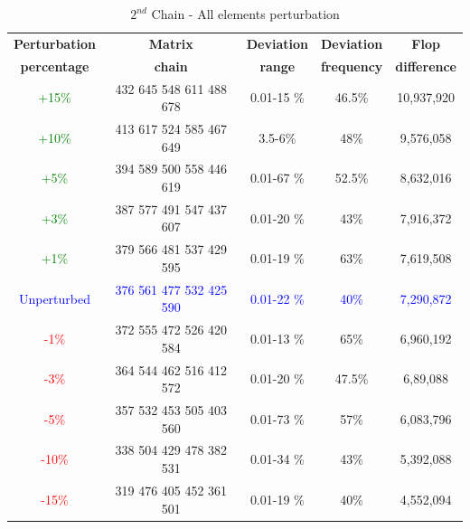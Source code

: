 \documentclass[10pts]{article}
\begin{document}
         \begin{table}[htp!]
         	\centering
         	
         	
         	\begin{tabular}{|c| c | c |c | c |}
         		\hline
         		\textbf{Perturbation} &\textbf{Matrix} & \textbf{Deviation} & \textbf{Deviation} & \textbf{Flop }\\
         		\textbf{percentage}&\textbf{chain}& \textbf{range}&\textbf{frequency}&\textbf{difference}\\
         		\hline
         		\textcolor{green}{+15\%}	&432 645 548 611 488 678	&	0.01-15 \%		&	46.5\%	&		10,937,920\\
         		\textcolor{green}{+10\%}	&413 617 524 585 467 649	&	3.5-6\%			&    48\%	&		9,576,058\\
         		\textcolor{green}{+5\%}	&394 589 500 558 446 619 &	0.01-67 \%		&	52.5\%	&		8,632,016\\
         		\textcolor{green}{+3\%}	&387 577 491 547 437 607	&	0.01-20 \%		&	43\%	&		7,916,372\\
         		\textcolor{green}{+1\%}	&379 566 481 537 429 595 &	0.01-19 \%		&	63\%	&		7,619,508\\
         		\textcolor{blue}{Unperturbed}	&\textcolor{blue}{376} \textcolor{blue}{561} \textcolor{blue}{477} \textcolor{blue}{532} \textcolor{blue}{425} \textcolor{blue}{590}	&    \textcolor{blue}{0.01-22 \%}		&	\textcolor{blue}{40\%}		&	\textcolor{blue}{7,290,872}\\
         		\textcolor{red}{-1\%}	&372 555 472 526 420 584	&	0.01-13 \%		&	65\%	&		6,960,192\\	
         		\textcolor{red}{-3\%}	&364 544 462 516 412 572 &	0.01-20 \%		&	47.5\%	 &		6,89,088\\
         		\textcolor{red}{-5\%}	&357 532 453 505 403 560	&	0.01-73 \%		&	57\%	 &		6,083,796\\
         		\textcolor{red}{-10\%}	&338 504 429 478 382 531	&	0.01-34 \%		&	43\%   	 &		5,392,088\\
         		\textcolor{red}{-15\%}	&319 476 405 452 361 501	&	0.01-19 \%		&	40\%	 &		4,552,094\\
         		\hline
         	\end{tabular}
         	
         	
         	\caption{$2^{nd}$ Chain - All elements perturbation}
         	\label{table:$2^{nd}$ Chain - All elements perturbation}
         \end{table}
         	
\end{document}
